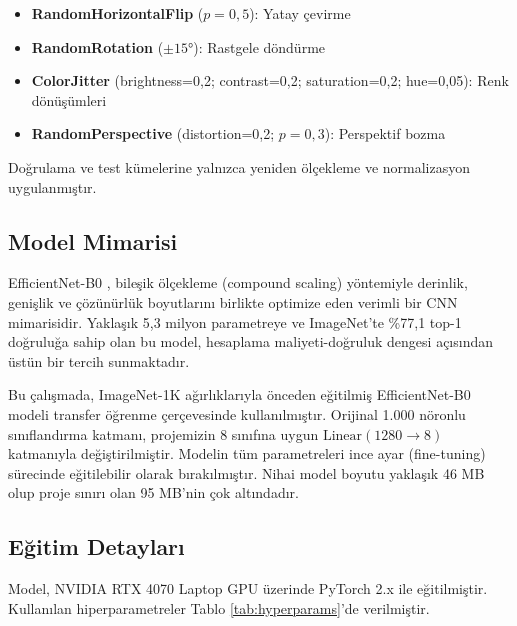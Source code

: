 \documentclass[conference]{IEEEtran}
\begin{document}
\begin{itemize}
  \item \textbf{RandomHorizontalFlip} ($p=0,5$): Yatay çevirme
  \item \textbf{RandomRotation} ($\pm15°$): Rastgele döndürme
  \item \textbf{ColorJitter} (brightness=0,2; contrast=0,2;
        saturation=0,2; hue=0,05): Renk dönüşümleri
  \item \textbf{RandomPerspective} (distortion=0,2; $p=0,3$):
        Perspektif bozma
\end{itemize}

Doğrulama ve test kümelerine yalnızca yeniden ölçekleme ve normalizasyon
uygulanmıştır.

\subsection{Model Mimarisi}

EfficientNet-B0 \cite{tan2019efficientnet}, bileşik ölçekleme (compound
scaling) yöntemiyle derinlik, genişlik ve çözünürlük boyutlarını birlikte
optimize eden verimli bir CNN mimarisidir. Yaklaşık 5,3 milyon parametreye
ve ImageNet'te \%77,1 top-1 doğruluğa sahip olan bu model,
hesaplama maliyeti-doğruluk dengesi açısından üstün bir tercih sunmaktadır.

Bu çalışmada, ImageNet-1K ağırlıklarıyla önceden eğitilmiş EfficientNet-B0
modeli transfer öğrenme çerçevesinde kullanılmıştır. Orijinal 1.000 nöronlu
sınıflandırma katmanı, projemizin 8 sınıfına uygun
$\text{Linear}(1280 \rightarrow 8)$ katmanıyla değiştirilmiştir.
Modelin tüm parametreleri ince ayar (fine-tuning) sürecinde
eğitilebilir olarak bırakılmıştır. Nihai model boyutu yaklaşık 46 MB
olup proje sınırı olan 95 MB'nin çok altındadır.

\subsection{Eğitim Detayları}

Model, NVIDIA RTX 4070 Laptop GPU üzerinde PyTorch 2.x ile eğitilmiştir.
Kullanılan hiperparametreler Tablo \ref{tab:hyperparams}'de verilmiştir.
\end{document}
